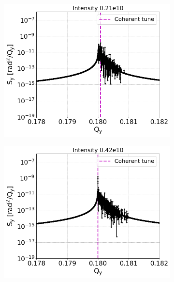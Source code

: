  \begin{figure}[htp]
    \centering
    \begin{subfigure}{.45\textwidth}
        \centering
        \includegraphics[width=.95\linewidth]{images/Ch7/psdY_intensity0.21e10.png}  
        \label{fig:study_9a}
    \end{subfigure}
    \begin{subfigure}{.45\textwidth}
        \centering
        \includegraphics[width=.95\linewidth]{images/Ch7/psdY_intensity0.42e10.png}
        \label{fig:study_9b}

\end{subfigure}
\end{figure}
